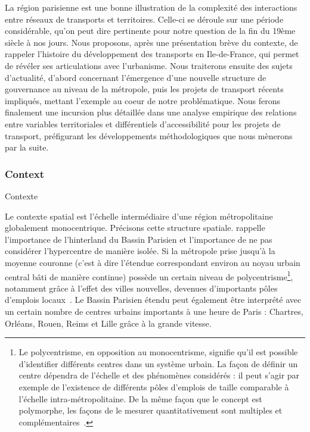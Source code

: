 La région parisienne est une bonne illustration de la complexité des interactions entre réseaux de transports et territoires. Celle-ci se déroule sur une période considérable, qu'on peut dire pertinente pour notre question de la fin du 19ème siècle à nos jours. Nous proposons, après une présentation brève du contexte, de rappeler l'histoire du développement des transports en Ile-de-France, qui permet de révéler ses articulations avec l'urbanisme. Nous traiterons ensuite des sujets d'actualité, d'abord concernant l'émergence d'une nouvelle structure de gouvernance au niveau de la métropole, puis les projets de transport récents impliqués, mettant l'exemple au coeur de notre problématique. Nous ferons finalement une incursion plus détaillée dans une analyse empirique des relations entre variables territoriales et différentiels d'accessibilité pour les projets de transport, préfigurant les développements méthodologiques que nous mènerons par la suite.



\subsubsection{Context}{Contexte}

Le contexte spatial est l'échelle intermédiaire d'une région métropolitaine globalement monocentrique. Précisons cette structure spatiale. \cite{gilli2005bassin} rappelle l'importance de l'hinterland du Bassin Parisien et l'importance de ne pas considérer l'hypercentre de manière isolée. Si la métropole prise jusqu'à la moyenne couronne (c'est à dire l'étendue correspondant environ au noyau urbain central bâti de manière continue) possède un certain niveau de polycentrisme\footnote{Le polycentrisme, en opposition au monocentrisme, signifie qu'il est possible d'identifier différents centres dans un système urbain. La façon de définir un centre dépendra de l'échelle et des phénomènes considérés : il peut s'agir par exemple de l'existence de différents pôles d'emplois de taille comparable à l'échelle intra-métropolitaine. De la même façon que le concept est polymorphe, les façons de le mesurer quantitativement sont multiples et complémentaires~\cite{servais2004polycentrisme}.}, notamment grâce à l'effet des villes nouvelles, devenues d'importants pôles d'emplois locaux~\cite{berroir2005contribution}. Le Bassin Parisien étendu peut également être interprété avec un certain nombre de centres urbains importants à une heure de Paris : Chartres, Orléans, Rouen, Reims et Lille grâce à la grande vitesse.



